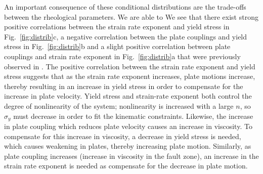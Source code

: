\documentclass[12pt]{article}
\begin{document}
An important consequence of these conditional distributions are the trade-offs between the rheological parameters. We are able to  We see that there exist strong positive correlations between the strain rate exponent and yield stress in Fig.~\ref{fig:distrib}c, a negative correlation between the plate couplings and yield stress in Fig.~\ref{fig:distrib}b and a slight positive correlation between plate couplings and strain rate exponent in Fig.~\ref{fig:distrib}a that were previously observed in \citep{ratnaswamy2015adjoint}. The positive correlation between the strain rate exponent and yield stress suggests that as the strain rate exponent increases, plate motions increase, thereby resulting in an increase in yield stress in order to compensate for the increase in plate velocity. 
Yield stress and strain-rate exponent both control the degree of nonlinearity of the system; nonlinearity is increased with a large $n$, so $\sigma_y$ must decrease in order to fit the kinematic constraints.
Likewise, the increase in plate coupling which reduces plate velocity causes an increase in viscosity.  To compensate for this increase in viscosity, a decrease in yield stress is needed, which causes weakening in plates, thereby increasing plate motion. Similarly, as plate coupling increases (increase in viscosity in the fault zone), an increase in the strain rate exponent is needed as compensate for the decrease in plate motion.  
\end{document}
